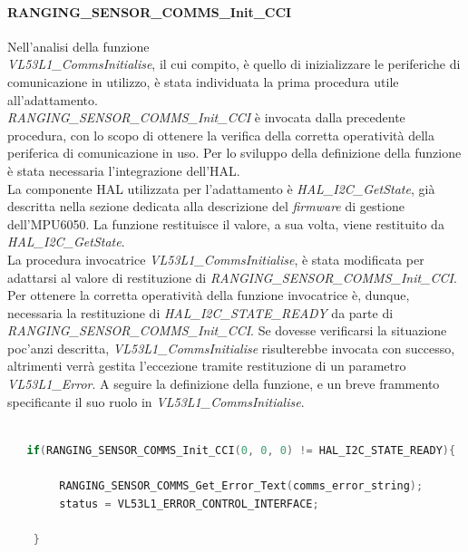 \documentclass[11pt]{report}
\begin{document}
\paragraph{RANGING\_SENSOR\_COMMS\_Init\_CCI}
Nell'analisi della funzione\\\textit{VL53L1\_CommsInitialise}, il cui compito, è quello di inizializzare le periferiche di comunicazione in utilizzo, è stata individuata la prima procedura utile all'adattamento.\\
\textit{RANGING\_SENSOR\_COMMS\_Init\_CCI} è invocata dalla precedente procedura, con lo scopo di ottenere la verifica della corretta operatività della periferica di comunicazione in uso.
Per lo sviluppo della definizione della funzione è stata necessaria l'integrazione dell'HAL.\\
La componente HAL utilizzata per l'adattamento è \textit{HAL\_I2C\_GetState}, già descritta nella sezione dedicata alla descrizione del \textit{firmware} di gestione dell'MPU6050.
La funzione restituisce il valore, a sua volta, viene restituito da \textit{HAL\_I2C\_GetState}.\\
La procedura invocatrice \textit{VL53L1\_CommsInitialise}, è stata modificata per adattarsi al valore di restituzione di \textit{RANGING\_SENSOR\_COMMS\_Init\_CCI}.\\
Per ottenere la corretta operatività della funzione invocatrice è, dunque, necessaria la restituzione di \textit{HAL\_I2C\_STATE\_READY} da parte di \textit{RANGING\_SENSOR\_COMMS\_Init\_CCI}.
Se dovesse verificarsi la situazione poc'anzi descritta, \textit{VL53L1\_CommsInitialise} risulterebbe invocata con successo, altrimenti verrà gestita l'eccezione tramite restituzione di un parametro \textit{VL53L1\_Error}.
A seguire la definizione della funzione, e un breve frammento specificante il suo ruolo in \textit{VL53L1\_CommsInitialise}.


\begin{lstlisting}[language=Cpp, caption={Dettaglio dell'implementazione di textit{RANGING\_SENSOR\_COMMS\_Init\_CCI} in \textit{VL53L1\_CommsInitialise}}]
    
   if(RANGING_SENSOR_COMMS_Init_CCI(0, 0, 0) != HAL_I2C_STATE_READY){

        RANGING_SENSOR_COMMS_Get_Error_Text(comms_error_string);
        status = VL53L1_ERROR_CONTROL_INTERFACE;

    }
\end{lstlisting}
\end{document}
